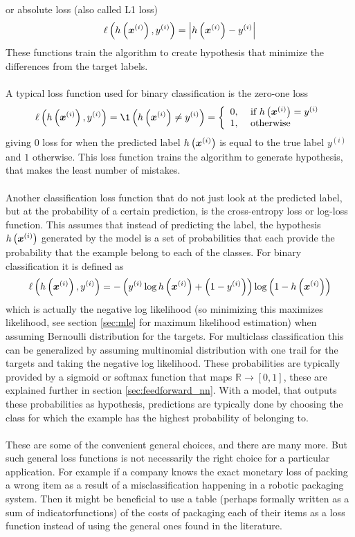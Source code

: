 or absolute loss (also called L1 loss)
$$ \ell\left(h\left (\boldsymbol{x}^{(i)}\right), y^{(i)}\right) = \left |h\left (\boldsymbol{x}^{(i)}\right) - y^{(i)}\right|$$
These functions train the algorithm to create hypothesis that minimize the differences from the target labels.
\\
\\
A typical loss function used for binary classification is the zero-one loss 
$$ \ell\left(h\lr{\boldsymbol{x}^{(i)}}, y^{(i)}\right)=\1\left(h\lr{\boldsymbol{x}^{(i)}} \neq y^{(i)} \right)=\left\{\begin{array}{ll}
0, & \text { if } h\lr{\boldsymbol{x}^{(i)}}=y^{(i)} \\
1, & \text { otherwise }
\end{array}\right. $$
giving $0$ loss for when the predicted label $h\left (\boldsymbol{x}^{(i)}\right)$ is equal to the true label $y^{(i)}$ and $1$ otherwise. This loss function trains the algorithm to generate hypothesis, that makes the least number of mistakes. 
\\
\\
Another classification loss function that do not just look at the predicted label, but at the probability of a certain prediction, is the cross-entropy loss or log-loss function. This assumes that instead of predicting the label, the hypothesis $h\left (\boldsymbol{x}^{(i)}\right)$ generated by the model is a set of probabilities that each provide the probability that the example belong to each of the classes. For binary classification it is defined as
\begin{equation*}
    \ell\left(h\left (\boldsymbol{x}^{(i)}\right), y^{(i)} \right) = - \left (y^{(i)} \log h\left (\boldsymbol{x}^{(i)}\right) + \left (1 - y^{(i)}\right)\right) \log \left (1 - h\left (\boldsymbol{x}^{(i)}\right)\right)
\end{equation*}
which is actually the negative log likelihood (so minimizing this maximizes likelihood, see section \ref{sec:mle} for maximum likelihood estimation) when assuming Bernoulli distribution for the targets. For multiclass classification this can be generalized by assuming multinomial distribution with one trail for the targets and taking the negative log likelihood. These probabilities are typically provided by a sigmoid or softmax function that maps $\mathbb{R} \rightarrow [0,1]$, these are explained further in section \ref{sec:feedforward_nn}. With a model, that outputs these probabilities as hypothesis, predictions are typically done by choosing the class for which the example has the highest probability of belonging to.
\\
\\
These are some of the convenient general choices, and there are many more. But such general loss functions is not necessarily the right choice for a particular application. For example if a company knows the exact monetary loss of packing a wrong item as a result of a misclassification happening in a robotic packaging system. Then it might be beneficial to use a table (perhaps formally written as a sum of indicatorfunctions) of the costs of packaging each of their items as a loss function instead of using the general ones found in the literature.



